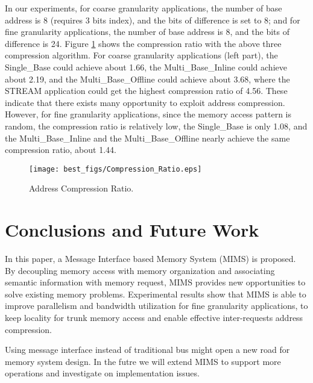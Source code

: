 \documentclass[pageno]{jpaper}
\begin{document}
In our experiments, for coarse granularity applications, the number of base address is 8 (requires 3 bits index), and the bits of difference is set to 8; and for fine granularity applications, the number of base address is 8, and the bits of difference is 24. Figure \ref{CompressionRatio} shows the compression ratio with the above three compression algorithm. For coarse granularity applications (left part), the Single\_Base could achieve about 1.66, the Multi\_Base\_Inline could achieve about 2.19, and the Multi\_Base\_Offline could achieve about 3.68, where the STREAM application could get the highest compression ratio of 4.56. These indicate that there exists many opportunity to exploit address compression. However, for fine granularity applications, since the memory access pattern is random, the compression ratio is relatively low, the Single\_Base is only 1.08, and the Multi\_Base\_Inline and the Multi\_Base\_Offline nearly achieve the same compression ratio, about 1.44.

\begin{figure}
  \centering
  \texttt{[image: best\_figs/Compression\_Ratio.eps]}
  \caption{Address Compression Ratio.}
  \label{CompressionRatio}
\end{figure}

\section {Conclusions and Future Work}

In this paper, a Message Interface based Memory System (MIMS) is proposed. By decoupling memory access with memory organization and associating semantic information with memory request, MIMS provides new opportunities to solve existing memory problems. Experimental results show that MIMS is able to improve parallelism and bandwidth utilization for fine granularity applications, to keep locality for trunk memory access and enable effective inter-requests address compression.

Using message interface instead of traditional bus might open a new road for memory system design. In the futre we will extend MIMS to support more operations and investigate on implementation issues.









\end{document}
